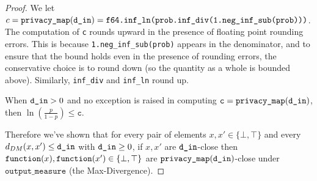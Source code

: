 \documentclass{article}
\begin{document}
\begin{proof}
We let $c = \texttt{privacy\_map}(\texttt{d\_in}) = \texttt{f64.inf\_ln(prob.inf\_div(1.neg\_inf\_sub(prob)))}$.
The computation of \texttt{c} rounds upward in the presence of floating point rounding errors. 
This is because \texttt{1.neg\_inf\_sub(prob)} appears in the denominator, and to ensure that the bound holds even in the presence of rounding errors, the conservative choice is to round down (so the quantity as a whole is bounded above). 
Similarly, \texttt{inf\_div} and \texttt{inf\_ln} round up. 

When $\texttt{d\_in} > 0$ and no exception is raised in computing $\texttt{c} = \texttt{privacy\_map}(\texttt{d\_in})$, then $\ln\left(\frac{p}{1 - p}\right) \leq \texttt{c}$. 

Therefore we've shown that for every pair of elements $x, x' \in \{\bot, \top\}$ and every $d_{DM}(x, x') \le \texttt{d\_in}$ with $\texttt{d\_in} \ge 0$, 
if $x, x'$ are $\texttt{d\_in}$-close then $\texttt{function}(x),\texttt{function}(x') \in \{\bot, \top\}$ are $\texttt{privacy\_map}(\texttt{d\_in})$-close under $\texttt{output\_measure}$ (the Max-Divergence).
\end{proof}




\end{document}
